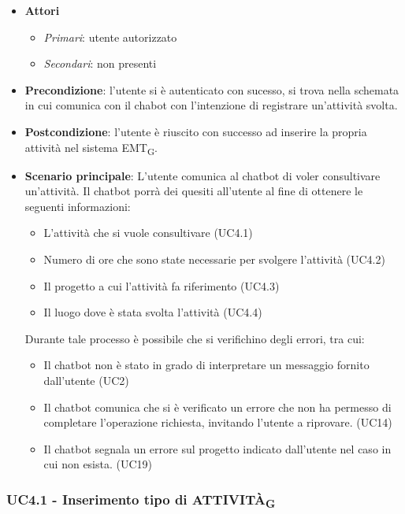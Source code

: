 \begin{itemize}
    \item \textbf{Attori}
    \begin{itemize} 
        \item \textit{Primari}: utente autorizzato
        \item \textit{Secondari}: non presenti
    \end{itemize}
 \item \textbf{Precondizione}: l'utente si è autenticato con sucesso, si trova nella schemata in cui comunica con il chabot con l'intenzione di registrare un'attività svolta. 
 \item \textbf{Postcondizione}: l'utente è riuscito con successo ad inserire la propria attività nel sistema EMT\textsubscript{G}.  
 \item \textbf{Scenario principale}: L'utente comunica al chatbot di voler consultivare un'attività. Il chatbot porrà dei quesiti all'utente al fine di ottenere le seguenti informazioni: 
    \begin{itemize}
        \item L'attività che si vuole consultivare (UC4.1)
        \item Numero di ore che sono state necessarie per svolgere l'attività (UC4.2)
        \item Il progetto a cui l'attività fa riferimento (UC4.3)
        \item Il luogo dove è stata svolta l'attività (UC4.4)
    \end{itemize}
 Durante tale processo è possibile che si verifichino degli errori, tra cui: 
    \begin{itemize}
        \item Il chatbot non è stato in grado di interpretare un messaggio fornito dall'utente (UC2)
        \item Il chatbot comunica che si è verificato un errore che non ha permesso di completare l'operazione richiesta, invitando l'utente a riprovare. (UC14)
        \item Il chatbot segnala un errore sul progetto indicato dall'utente nel caso in cui non esista. (UC19)
    \end{itemize}
\end{itemize}

\newpage

\subsubsection{UC4.1 - Inserimento tipo di ATTIVITÀ\textsubscript{G}}

